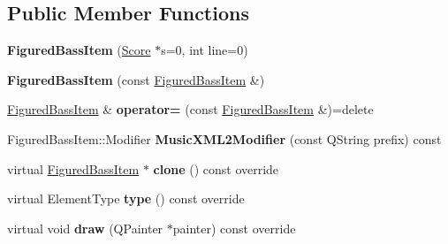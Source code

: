 \subsection*{Public Member Functions}
\begin{DoxyCompactItemize}
\item 
\mbox{\label{class_ms_1_1_figured_bass_item_a9b7eb1df4d146559f7c508637e61dd71}} 
{\bfseries Figured\+Bass\+Item} (\hyperlink{class_ms_1_1_score}{Score} $\ast$s=0, int line=0)
\item 
\mbox{\label{class_ms_1_1_figured_bass_item_ae0e2a1f688b8637a42030d3e25a6052f}} 
{\bfseries Figured\+Bass\+Item} (const \hyperlink{class_ms_1_1_figured_bass_item}{Figured\+Bass\+Item} \&)
\item 
\mbox{\label{class_ms_1_1_figured_bass_item_a412b9469c333b7a9876b5a46aac8880a}} 
\hyperlink{class_ms_1_1_figured_bass_item}{Figured\+Bass\+Item} \& {\bfseries operator=} (const \hyperlink{class_ms_1_1_figured_bass_item}{Figured\+Bass\+Item} \&)=delete
\item 
\mbox{\label{class_ms_1_1_figured_bass_item_a7d92e424498adfc4b0e686939ccc4182}} 
Figured\+Bass\+Item\+::\+Modifier {\bfseries Music\+X\+M\+L2\+Modifier} (const Q\+String prefix) const
\item 
\mbox{\label{class_ms_1_1_figured_bass_item_ac6e857feac1d1a91c833ad1c67331cad}} 
virtual \hyperlink{class_ms_1_1_figured_bass_item}{Figured\+Bass\+Item} $\ast$ {\bfseries clone} () const override
\item 
\mbox{\label{class_ms_1_1_figured_bass_item_ace6025238bd6b04abaf40dbe1e0864e9}} 
virtual Element\+Type {\bfseries type} () const override
\item 
\mbox{\label{class_ms_1_1_figured_bass_item_a566b94b6d9a32355a7c384ab36a2d160}} 
virtual void {\bfseries draw} (Q\+Painter $\ast$painter) const override
\item 
\mbox{\label{class_ms_1_1_figured_bass_item_a12153ca7d2360ef4ba71f30061c52113}} 

\end{DoxyCompactItemize}
